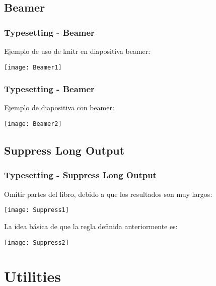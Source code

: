 \documentclass[11pt]{beamer}					%
\begin{document}
	\subsection{Beamer}
		\begin{frame}
			\frametitle{Typesetting - Beamer}
				\begin{block}{Ejemplo de uso de knitr en diapositiva beamer:}
						\begin{center}
						\texttt{[image: Beamer1]} 
						\end{center}
				\end{block}
		\end{frame}
		\begin{frame}
			\frametitle{Typesetting - Beamer}
				\begin{block}{Ejemplo de diapositiva con beamer:}
					\begin{small}
						\begin{center}
						\texttt{[image: Beamer2]} 
						\end{center}
					\end{small}
				\end{block}
		\end{frame}
	\subsection{Suppress Long Output}
		\begin{frame}
			\frametitle{Typesetting - Suppress Long Output}
				\begin{block}{Omitir partes del libro, debido a que los resultados son muy largos:}
						\begin{center}
						\texttt{[image: Suppress1]} 
						\end{center}
				\end{block}
				\begin{block}{La idea básica de que la regla definida anteriormente es:}
					\begin{small}
						\begin{center}
						\texttt{[image: Suppress2]} 
						\end{center}
					\end{small}
				\end{block}
		\end{frame}

\section{Utilities}
\end{document}
